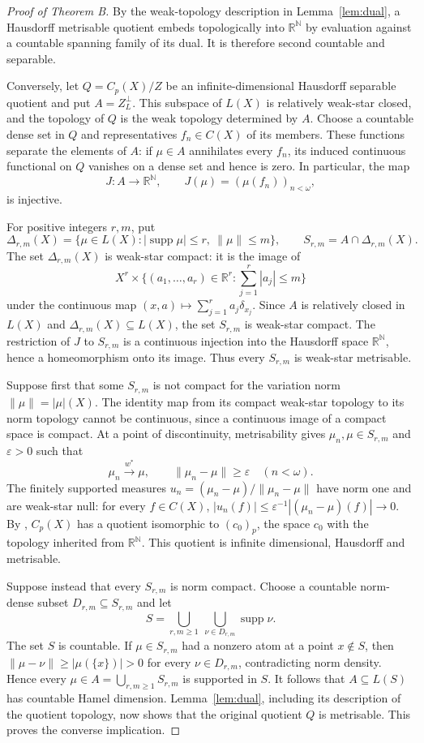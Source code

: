 \documentclass[a4paper,11pt]{amsart}
\theoremstyle{plain}
\theoremstyle{definition}
\theoremstyle{remark}
\newcommand{\R}{\mathbb R}
\newcommand{\N}{\mathbb N}
\newcommand{\supp}{\operatorname{supp}}
\newcommand{\eps}{\varepsilon}
\numberwithin{equation}{section}
\begin{document}
\begin{proof}[Proof of Theorem B]
By the weak-topology description in Lemma~\ref{lem:dual}, a Hausdorff metrisable quotient embeds topologically into $\R^\N$ by evaluation against a countable spanning family of its dual. It is therefore second countable and separable.

Conversely, let $Q=C_p(X)/Z$ be an infinite-dimensional Hausdorff separable quotient and put $A=Z_L^\perp$. This subspace of $L(X)$ is relatively weak-star closed, and the topology of $Q$ is the weak topology determined by $A$. Choose a countable dense set in $Q$ and representatives $f_n\in C(X)$ of its members. These functions separate the elements of $A$: if $\mu\in A$ annihilates every $f_n$, its induced continuous functional on $Q$ vanishes on a dense set and hence is zero. In particular, the map
\[
J:A\longrightarrow\R^\N,\qquad J(\mu)=(\mu(f_n))_{n<\omega},
\]
is injective.

For positive integers $r,m$, put
\[
\Delta_{r,m}(X)=\{\mu\in L(X):|\supp\mu|\leqslant r,\ \|\mu\|\leqslant m\},
\qquad S_{r,m}=A\cap\Delta_{r,m}(X).
\]
The set $\Delta_{r,m}(X)$ is weak-star compact: it is the image of
\[
X^r\times\{(a_1,\ldots,a_r)\in\R^r:\textstyle\sum_{j=1}^r|a_j|\leqslant m\}
\]
under the continuous map $(x,a)\mapsto\sum_{j=1}^ra_j\delta_{x_j}$.
Since $A$ is relatively closed in $L(X)$ and $\Delta_{r,m}(X)\subseteq L(X)$, the set $S_{r,m}$ is weak-star compact. The restriction of $J$ to $S_{r,m}$ is a continuous injection into the Hausdorff space $\R^\N$, hence a homeomorphism onto its image. Thus every $S_{r,m}$ is weak-star metrisable.

Suppose first that some $S_{r,m}$ is not compact for the variation norm $\|\mu\|=|\mu|(X)$. The identity map from its compact weak-star topology to its norm topology cannot be continuous, since a continuous image of a compact space is compact. At a point of discontinuity, metrisability gives $\mu_n,\mu\in S_{r,m}$ and $\eps>0$ such that
\[
\mu_n\xrightarrow{w^*}\mu,\qquad \|\mu_n-\mu\|\geqslant\eps\quad(n<\omega).
\]
The finitely supported measures $u_n=(\mu_n-\mu)/\|\mu_n-\mu\|$ have norm one and are weak-star null: for every $f\in C(X)$,
$|u_n(f)|\leqslant\eps^{-1}|(\mu_n-\mu)(f)|\to0$.
By \cite[Theorem~1]{BKS2019}, $C_p(X)$ has a quotient isomorphic to $(c_0)_p$, the space $c_0$ with the topology inherited from $\R^\N$. This quotient is infinite dimensional, Hausdorff and metrisable.

Suppose instead that every $S_{r,m}$ is norm compact. Choose a countable norm-dense subset $D_{r,m}\subseteq S_{r,m}$ and let
\[
S=\bigcup_{r,m\geqslant1}\ \bigcup_{\nu\in D_{r,m}}\supp\nu.
\]
The set $S$ is countable. If $\mu\in S_{r,m}$ had a nonzero atom at a point $x\notin S$, then
$\|\mu-\nu\|\geqslant|\mu(\{x\})|>0$ for every $\nu\in D_{r,m}$, contradicting norm density. Hence every $\mu\in A=\bigcup_{r,m\geqslant1}S_{r,m}$ is supported in $S$. It follows that $A\subseteq L(S)$ has countable Hamel dimension. Lemma~\ref{lem:dual}, including its description of the quotient topology, now shows that the original quotient $Q$ is metrisable. This proves the converse implication.
\end{proof}
\end{document}
